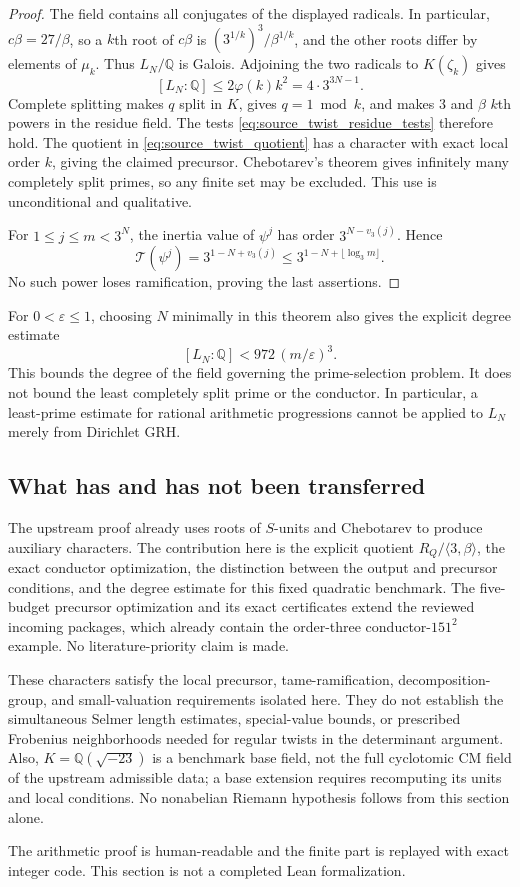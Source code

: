 \begin{proof}
The field contains all conjugates of the displayed radicals.
In particular, $c\beta=27/\beta$, so a $k$th root of $c\beta$ is
$(3^{1/k})^3/\beta^{1/k}$, and the other roots differ by elements
of $\mu_k$.  Thus $L_N/\mathbb Q$ is Galois.  Adjoining the two
radicals to $K(\zeta_k)$ gives
\[
       [L_N:\mathbb Q]\le2\varphi(k)k^2
                           =4\cdot3^{3N-1}.
\]
Complete splitting makes $q$ split in $K$, gives $q=1\bmod k$,
and makes $3$ and $\beta$ $k$th powers in the residue field.
The tests \eqref{eq:source_twist_residue_tests} therefore hold.
The quotient in \eqref{eq:source_twist_quotient} has a character
with exact local order $k$, giving the claimed precursor.
Chebotarev's theorem gives infinitely many completely split primes,
so any finite set may be excluded.  This use is unconditional and
qualitative.\cite{milneCFT}

For $1\le j\le m<3^N$, the inertia value of $\psi^j$ has order
$3^{N-v_3(j)}$.  Hence
\[
        \mathcal T(\psi^j)=3^{1-N+v_3(j)}
            \le3^{1-N+\lfloor\log_3m\rfloor}.
\]
No such power loses ramification, proving the last assertions.
\end{proof}

For $0<\varepsilon\le1$, choosing $N$ minimally in this theorem
also gives the explicit degree estimate
\[
            [L_N:\mathbb Q]<972\,(m/\varepsilon)^3.
\]
This bounds the degree of the field governing the prime-selection
problem.  It does not bound the least completely split prime or the
conductor.  In particular, a least-prime estimate for rational
arithmetic progressions cannot be applied to $L_N$ merely from
Dirichlet GRH.

\subsection{What has and has not been transferred}

The upstream proof already uses roots of $S$-units and Chebotarev to
produce auxiliary characters.\cite{sourceAuxPrimes}
The contribution here is the explicit quotient
$R_Q/\langle3,\beta\rangle$, the exact conductor optimization,
the distinction between the output and precursor conditions, and
the degree estimate for this fixed quadratic benchmark.
The five-budget precursor optimization and its exact certificates
extend the reviewed incoming packages, which already contain the
order-three conductor-$151^2$ example. No literature-priority claim
is made.

These characters satisfy the local precursor, tame-ramification,
decomposition-group, and small-valuation requirements isolated here.
They do not establish the simultaneous Selmer length estimates,
special-value bounds, or prescribed Frobenius neighborhoods needed
for regular twists in the determinant argument.  Also,
$K=\mathbb Q(\sqrt{-23})$ is a benchmark base field, not the full
cyclotomic CM field of the upstream admissible data; a base extension
requires recomputing its units and local conditions.  No nonabelian
Riemann hypothesis follows from this section alone.

The arithmetic proof is human-readable and the finite part is replayed
with exact integer code.  This section is not a completed Lean
formalization.
